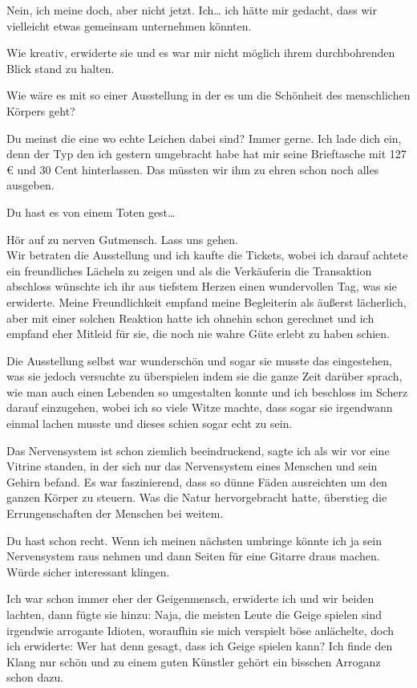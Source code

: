 \documentclass[11pt, a5paper]{article}
\begin{document}
\begin{spacing}{1.2}
		\frqq Nein, ich meine doch, aber nicht jetzt. Ich… ich hätte mir gedacht, dass wir vielleicht etwas gemeinsam unternehmen könnten.\flqq
		
		\frqq Wie kreativ\flqq, erwiderte sie und es war mir nicht möglich ihrem durchbohrenden Blick stand zu halten.
		
		\frqq Wie wäre es mit so einer Ausstellung in der es um die Schönheit des menschlichen Körpers geht?\flqq
		
		\frqq Du meinst die eine wo echte Leichen dabei sind? Immer gerne. Ich lade dich ein, denn der Typ den ich gestern umgebracht habe hat mir seine Brieftasche mit 127 € und 30 Cent hinterlassen. Das müssten wir ihm zu ehren schon noch alles ausgeben.\flqq
		
		\frqq Du hast es von einem Toten gest…\flqq
		
		\frqq Hör auf zu nerven Gutmensch. Lass uns gehen.\flqq\\
		
		Wir betraten die Ausstellung und ich kaufte die Tickets, wobei ich darauf achtete ein freundliches Lächeln zu zeigen und als die Verkäuferin die Transaktion abschloss wünschte ich ihr aus tiefstem Herzen einen wundervollen Tag, was sie erwiderte. Meine Freundlichkeit empfand meine Begleiterin als äußerst lächerlich, aber mit einer solchen Reaktion hatte ich ohnehin schon gerechnet und ich empfand eher Mitleid für sie, die noch nie wahre Güte erlebt zu haben schien.
		
		Die Ausstellung selbst war wunderschön und sogar sie musste das eingestehen, was sie jedoch versuchte zu überspielen indem sie die ganze Zeit darüber sprach, wie man auch einen Lebenden so umgestalten konnte und ich beschloss im Scherz darauf einzugehen, wobei ich so viele Witze machte, dass sogar sie irgendwann einmal lachen musste und dieses schien sogar echt zu sein.
		
		\frqq Das Nervensystem ist schon ziemlich beeindruckend\flqq , sagte ich als wir vor eine Vitrine standen, in der sich nur das Nervensystem eines Menschen und sein Gehirn befand. Es war faszinierend, dass so dünne Fäden ausreichten um den ganzen Körper zu steuern. Was die Natur hervorgebracht hatte, überstieg die Errungenschaften der Menschen bei weitem.
		
		\frqq Du hast schon recht. Wenn ich meinen nächsten umbringe könnte ich ja sein Nervensystem raus nehmen und dann Seiten für eine Gitarre draus machen. Würde sicher interessant klingen.\flqq
		
		\frqq Ich war schon immer eher der Geigenmensch\flqq , erwiderte ich und wir beiden lachten, dann fügte sie hinzu: \frqq Naja, die meisten Leute die Geige spielen sind irgendwie arrogante Idioten\flqq , woraufhin sie mich verspielt böse anlächelte, doch ich erwiderte: \frqq Wer hat denn gesagt, dass ich Geige spielen kann? Ich finde den Klang nur schön und zu einem guten Künstler gehört ein bisschen Arroganz schon dazu.\flqq
		

\end{spacing}
\end{document}
